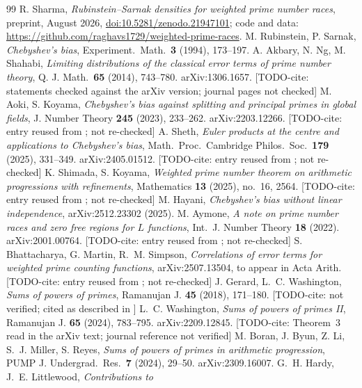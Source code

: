 \documentclass[11pt]{amsart}
\theoremstyle{definition}
\numberwithin{equation}{section}
\newcommand{\todocite}[1]{\textsf{[TODO-cite: #1]}}
\begin{document}
\begin{thebibliography}{99}
 R. Sharma, \emph{Rubinstein--Sarnak densities for
weighted prime number races}, preprint, August 2026,
\href{https://doi.org/10.5281/zenodo.21947101}{doi:10.5281/zenodo.21947101};
code and data: \url{https://github.com/raghavs1729/weighted-prime-races}.
 M. Rubinstein, P. Sarnak, \emph{Chebyshev's bias},
Experiment.\ Math.\ \textbf{3} (1994), 173--197.
 A. Akbary, N. Ng, M. Shahabi, \emph{Limiting
distributions of the classical error terms of prime number theory},
Q. J. Math.\ \textbf{65} (2014), 743--780. arXiv:1306.1657.
\todocite{statements checked against the arXiv version; journal pages
not checked}
 M. Aoki, S. Koyama, \emph{Chebyshev's bias against
splitting and principal primes in global fields}, J. Number Theory
\textbf{245} (2023), 233--262. arXiv:2203.12266.
\todocite{entry reused from \cite{WR}; not re-checked}
 A. Sheth, \emph{Euler products at the centre and
applications to Chebyshev's bias}, Math.\ Proc.\ Cambridge Philos.\
Soc.\ \textbf{179} (2025), 331--349. arXiv:2405.01512.
\todocite{entry reused from \cite{WR}; not re-checked}
 K. Shimada, S. Koyama, \emph{Weighted prime number
theorem on arithmetic progressions with refinements}, Mathematics
\textbf{13} (2025), no.\ 16, 2564.
\todocite{entry reused from \cite{WR}; not re-checked}
 M. Hayani, \emph{Chebyshev's bias without linear
independence}, arXiv:2512.23302 (2025).
 M. Aymone, \emph{A note on prime number races and zero
free regions for $L$ functions}, Int.\ J. Number Theory \textbf{18}
(2022). arXiv:2001.00764.
\todocite{entry reused from \cite{WR}; not re-checked}
 S. Bhattacharya, G. Martin, R.~M. Simpson,
\emph{Correlations of error terms for weighted prime counting
functions}, arXiv:2507.13504, to appear in Acta Arith.
\todocite{entry reused from \cite{WR}; not re-checked}
 J. Gerard, L.~C. Washington, \emph{Sums of powers of
primes}, Ramanujan J. \textbf{45} (2018), 171--180.
\todocite{not verified; cited as described in \cite{Was24}}
 L.~C. Washington, \emph{Sums of powers of primes II},
Ramanujan J. \textbf{65} (2024), 783--795. arXiv:2209.12845.
\todocite{Theorem~3 read in the arXiv text; journal reference not
verified}
 M. Boran, J. Byun, Z. Li, S.~J. Miller, S. Reyes,
\emph{Sums of powers of primes in arithmetic progression}, PUMP J.
Undergrad.\ Res.\ \textbf{7} (2024), 29--50. arXiv:2309.16007.
 G.~H. Hardy, J.~E. Littlewood, \emph{Contributions to
}
\end{thebibliography}
\end{document}
